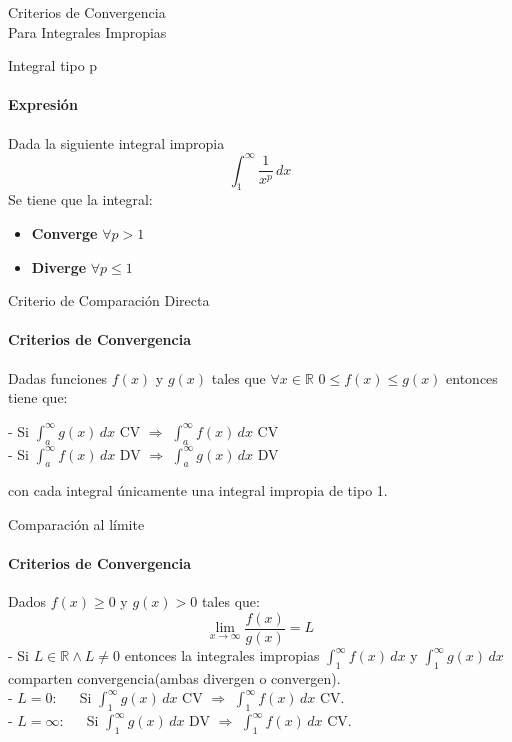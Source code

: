 \documentclass{plantillaPPT}
\begin{document}
\primeraDiapo

\begin{frame}[plain]
    \centering
    {\huge {} Criterios de Convergencia} \\
    {\large Para Integrales Impropias}
\end{frame}

\begin{frame}{Integral tipo p}
\framesubtitle{Expresión}

Dada la siguiente integral impropia
\[
\int_1^\infty \frac{1}{x^p}\,dx
\]
Se tiene que la integral:
\vspace{0.3cm}
\begin{itemize}
    \item \textbf{Converge} \(\forall p>1\)
    \vspace{0.2cm}
    \item \textbf{Diverge} \(\forall p\leq1\)
\end{itemize}
    
\end{frame}

\begin{frame}{Criterio de Comparación Directa}
\framesubtitle{Criterios de Convergencia}

Dadas funciones \(f(x)\) y \(g(x)\) tales que \(\forall x\in\mathbb{R}\) \(0\leq f(x)\leq g(x)\) entonces tiene que:\\[3ex]
\begin{center}
- Si \(\displaystyle\int_{a}^{\infty}g(x)\,dx\) CV \(\Rightarrow\) \(\displaystyle\int_{a}^{\infty}f(x)\,dx\) CV\\[3ex]
- Si \(\displaystyle\int_{a}^{\infty}f(x)\,dx\) DV \(\Rightarrow\) \(\displaystyle\int_{a}^{\infty}g(x)\,dx\) DV
\end{center}
con cada integral únicamente una integral impropia de tipo 1.
\end{frame}

\begin{frame}{Comparación al límite}
\framesubtitle{Criterios de Convergencia}

Dados \(f(x) \geq 0\) y \(g(x)>0\) tales que:
\[\lim_{x\to\infty}\frac{f(x)}{g(x)}=L\]
- Si \(L\in\mathbb{R} \land L\neq0\) entonces la integrales impropias \(\displaystyle\int_1^{\infty}f(x)\,dx\) y \(\displaystyle\int_1^{\infty}g(x)\,dx\) comparten convergencia(ambas divergen o convergen).\\[2ex]
- \(L = 0\): \(\quad\) Si \(\displaystyle\int_1^{\infty}g(x)\,dx\) CV \(\Rightarrow\) \(\displaystyle\int_1^{\infty}f(x)\,dx\) CV. \\[2ex]
- \(L = \infty\): \(\quad\) Si \(\displaystyle\int_1^{\infty}g(x)\,dx\) DV \(\Rightarrow\) \(\displaystyle\int_1^{\infty}f(x)\,dx\) CV.

\end{frame}
\end{document}
